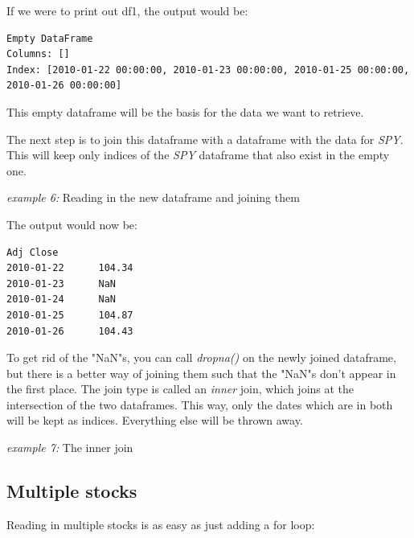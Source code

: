 \noindent If we were to print out df1, the output would be:
\begin{lstlisting}[style=python]
Empty DataFrame
Columns: []
Index: [2010-01-22 00:00:00, 2010-01-23 00:00:00, 2010-01-25 00:00:00, 2010-01-26 00:00:00]
\end{lstlisting}

\noindent This empty dataframe will be the basis for the data we want to retrieve.

\noindent The next step is to join this dataframe with a dataframe with the data for \textit{SPY}. This will keep only indices of the \textit{SPY} dataframe that also exist in the empty one.\\

\noindent\begin{minipage}{\linewidth}
\noindent\textit{example 6:} Reading in the new dataframe and joining them


\end{minipage}

\noindent\begin{minipage}{\linewidth}
\noindent The output would now be:
\begin{lstlisting}[style=python]
				Adj Close
2010-01-22		104.34
2010-01-23		NaN
2010-01-24		NaN
2010-01-25		104.87
2010-01-26		104.43
\end{lstlisting}
\end{minipage}

\noindent To get rid of the "NaN"s, you can call \textit{dropna()} on the newly joined dataframe, but there is a better way of joining them such that the "NaN"s don't appear in the first place. The join type is called an \textit{inner} join, which joins at the intersection of the two dataframes. This way, only the dates which are in both will be kept as indices. Everything else will be thrown away.\\

\noindent\begin{minipage}{\linewidth}
\noindent\textit{example 7:} The inner join


\end{minipage}

\subsection{Multiple stocks}
\noindent Reading in multiple stocks is as easy as just adding a for loop:\\


